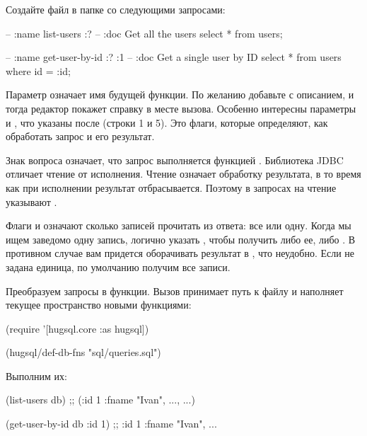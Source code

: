 Создайте файл  в папке  со следующими запросами:

\begin{english}
  \begin{sql/lines}
-- :name list-users :?
-- :doc Get all the users
select * from users;

-- :name get-user-by-id :? :1
-- :doc Get a single user by ID
select * from users
where id = :id;
  \end{sql/lines}
\end{english}

Параметр  означает имя будущей функции. По желанию добавьте  с описанием, и тогда редактор покажет справку в месте вызова. Особенно интересны параметры  и , что указаны после  (строки 1 и 5). Это флаги, которые определяют, как обработать запрос и его результат.

Знак вопроса означает, что запрос выполняется функцией . Библиотека JDBC отличает чтение от исполнения. Чтение означает обработку результата, в то время как при исполнении результат отбрасывается. Поэтому в запросах на чтение указывают .

Флаги \code{:*} и  означают сколько записей прочитать из ответа: все или одну. Когда мы ищем заведомо одну запись, логично указать , чтобы получить либо ее, либо . В противном случае вам придется оборачивать результат в , что неудобно. Если не задана единица, по умолчанию получим все записи.

Преобразуем запросы в функции. Вызов  принимает путь к файлу и наполняет текущее пространство новыми функциями:

\begin{english}
  \begin{clojure}
(require '[hugsql.core :as hugsql])

(hugsql/def-db-fns "sql/queries.sql")
  \end{clojure}
\end{english}

Выполним их:

\begin{english}
  \begin{clojure}
(list-users db)
;; ({:id 1 :fname "Ivan", ...}, ...)

(get-user-by-id db {:id 1})
;; {:id 1 :fname "Ivan", ...}
  \end{clojure}
\end{english}

